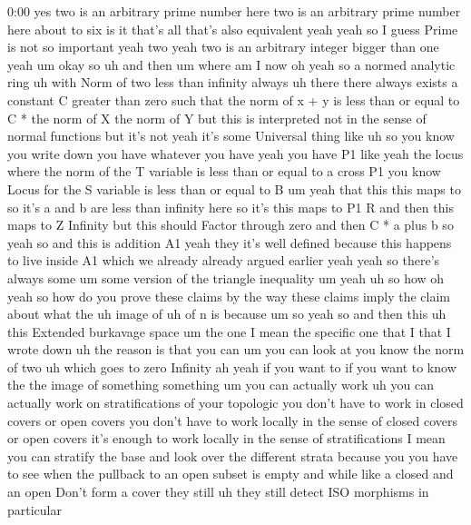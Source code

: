 \begin{unfinished}{0:00}
yes  two  is  an  arbitrary  prime  number
here  two  is  an  arbitrary  prime  number
here  about  to  six  is  it  that's  all
that's  also  equivalent  yeah  yeah  so  I
guess  Prime  is  not  so  important
yeah  two  yeah  two  is  an  arbitrary
integer  bigger  than  one  yeah
um  okay
so
uh  and  then
um  where  am  I  now  oh  yeah  so  a  normed
analytic
ring  uh  with  Norm  of  two  less  than
infinity
always  uh  there  there  always  exists  a
constant  C  greater  than  zero  such  that
the  norm  of  x  +  y  is  less  than  or  equal
to  C  *  the  norm  of
X  the  norm  of
Y  but  this  is  interpreted  not  in  the
sense  of  normal  functions  but  it's  not
yeah  it's  some  Universal  thing  like  uh
so  you  know  you  write  down  you
have  whatever  you
have  yeah  you  have  P1  like  yeah  the
locus  where  the  norm  of  the  T  variable
is  less  than  or  equal  to  a  cross  P1  you
know  Locus  for  the  S  variable  is  less
than  or  equal  to  B  um  yeah  that  this
this  maps
to  so  it's  a  and  b  are  less  than
infinity  here  so
it's  this  maps  to  P1  R  and  then  this
maps  to  Z  Infinity  but  this  should
Factor  through  zero  and  then  C  *  a  plus
b
so  yeah
so
and  this  is
addition
A1  yeah  they  it's  well  defined  because
this  happens  to  live  inside  A1  which  we
already  already  argued  earlier
yeah  yeah  so  there's  always  some  um  some
version  of  the  triangle
inequality  um
yeah
uh  so  how  oh  yeah  so  how  do  you  prove
these  claims  by  the  way  these  claims
imply  the  claim  about  what  the  uh  image
of  uh  of  n  is  because
um  so  yeah  so  and
then
this  uh  this  Extended  burkavage
space  um  the  one  I  mean  the  specific  one
that  I  that  I  wrote  down  uh  the  reason
is  that  you  can  um  you  can  look  at  you
know  the  norm  of
two  uh  which  goes  to  zero  Infinity  ah
yeah  if  you  want  to  if  you  want  to  know
the  the  image  of  something  something  um
you  can  actually  work  uh  you  can
actually  work  on  stratifications  of  your
topologic  you  don't  have  to  work  in
closed  covers  or  open  covers  you  don't
have  to  work  locally  in  the  sense  of
closed  covers  or  open  covers  it's  enough
to  work  locally  in  the  sense  of
stratifications  I  mean  you  can  stratify
the  base  and  look  over  the  different
strata  because  you  you  have  to  see  when
the  pullback  to  an  open  subset  is  empty
and  while  like  a  closed  and  an  open
Don't  form  a  cover  they  still  uh  they
still  detect  ISO  morphisms  in  particular

\end{unfinished}
